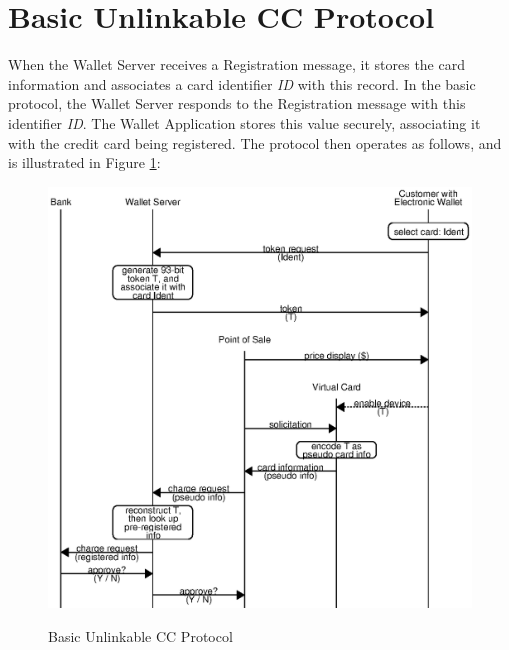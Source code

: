 \section{Basic Unlinkable CC Protocol}
\label{sec:unlinkable-design-1}

When the Wallet Server receives a Registration message, it stores the card information and associates a card identifier \emph{ID} with this record.
In the basic protocol, the Wallet Server responds to the Registration message with this identifier \emph{ID}.
The Wallet Application stores this value securely, associating it with the credit card being registered.
The protocol then operates as follows, and is illustrated in Figure \ref{fig:unlinkable-1}:

\begin{figure}[h!]
  \caption{Basic Unlinkable CC Protocol}
  \centering
    \includegraphics{img/unlinkable-1.eps}
  \label{fig:unlinkable-1}
\end{figure}

